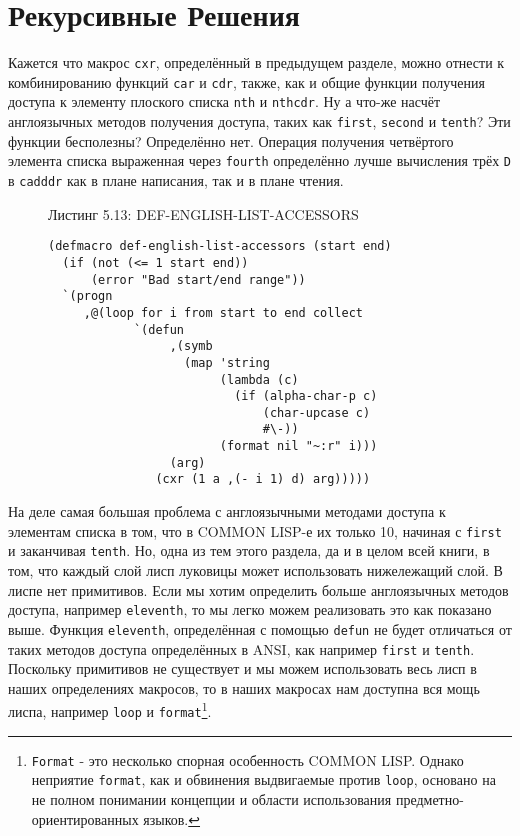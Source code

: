 \section{Рекурсивные Решения}\label{section_recursive_solutions}

Кажется что макрос \verb"cxr", определённый в предыдущем разделе, можно отнести к комбинированию функций \verb"car" и \verb"cdr", также, как и общие функции получения доступа к элементу плоского списка \verb"nth" и \verb"nthcdr". Ну а что-же насчёт англоязычных методов получения доступа, таких как \verb"first", \verb"second" и \verb"tenth"? Эти функции бесполезны? Определённо нет. Операция получения четвёртого элемента списка выраженная через \verb"fourth" определённо лучше вычисления трёх \verb"D" в \verb"cadddr" как в плане написания, так и в плане чтения.

\begin{figure}Листинг 5.13: DEF-ENGLISH-LIST-ACCESSORS\label{listing_5.13}
\listbegin
\begin{verbatim}
(defmacro def-english-list-accessors (start end)
  (if (not (<= 1 start end))
      (error "Bad start/end range"))
  `(progn
     ,@(loop for i from start to end collect
            `(defun
                 ,(symb
                   (map 'string
                        (lambda (c)
                          (if (alpha-char-p c)
                              (char-upcase c)
                              #\-))
                        (format nil "~:r" i)))
                 (arg)
               (cxr (1 a ,(- i 1) d) arg)))))
\end{verbatim}
\listend
\end{figure}

На деле самая большая проблема с англоязычными методами доступа к элементам списка в том, что в COMMON LISP-е их только 10, начиная с \verb"first" и заканчивая \verb"tenth". Но, одна из тем этого раздела, да и в целом всей книги, в том, что каждый слой лисп луковицы может использовать нижележащий слой. В лиспе нет примитивов. Если мы хотим определить больше англоязычных методов доступа, например \verb"eleventh", то мы легко можем реализовать это как показано выше. Функция \verb"eleventh", определённая с помощью \verb"defun" не будет отличаться от таких методов доступа определённых в ANSI, как например \verb"first" и \verb"tenth". Поскольку примитивов не существует и мы можем использовать весь лисп в наших определениях макросов, то в наших макросах нам доступна вся мощь лиспа, например \verb"loop" и \verb"format"\footnote{\verb"Format" - это несколько спорная особенность COMMON LISP. Однако неприятие \verb"format", как и обвинения выдвигаемые против \verb"loop", основано на не полном понимании концепции и области использования предметно-ориентированных языков.}.



